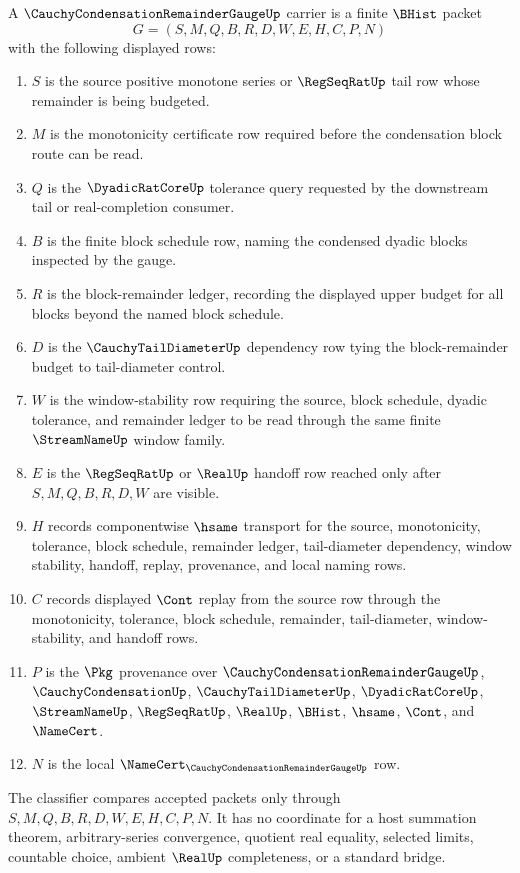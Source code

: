 \begin{definition}
\label{def:cauchy-condensation-remainder-gauge-carrier}
A $\CauchyCondensationRemainderGaugeUp$ carrier is a finite $\BHist$ packet
$$
G=(S,M,Q,B,R,D,W,E,H,C,P,N)
$$
with the following displayed rows:
\begin{enumerate}
\item $S$ is the source positive monotone series or $\RegSeqRatUp$ tail row whose remainder is being budgeted.
\item $M$ is the monotonicity certificate row required before the condensation block route can be read.
\item $Q$ is the $\DyadicRatCoreUp$ tolerance query requested by the downstream tail or real-completion consumer.
\item $B$ is the finite block schedule row, naming the condensed dyadic blocks inspected by the gauge.
\item $R$ is the block-remainder ledger, recording the displayed upper budget for all blocks beyond the named block schedule.
\item $D$ is the $\CauchyTailDiameterUp$ dependency row tying the block-remainder budget to tail-diameter control.
\item $W$ is the window-stability row requiring the source, block schedule, dyadic tolerance, and remainder ledger to be read through the same finite $\StreamNameUp$ window family.
\item $E$ is the $\RegSeqRatUp$ or $\RealUp$ handoff row reached only after $S,M,Q,B,R,D,W$ are visible.
\item $H$ records componentwise $\hsame$ transport for the source, monotonicity, tolerance, block schedule, remainder ledger, tail-diameter dependency, window stability, handoff, replay, provenance, and local naming rows.
\item $C$ records displayed $\Cont$ replay from the source row through the monotonicity, tolerance, block schedule, remainder, tail-diameter, window-stability, and handoff rows.
\item $P$ is the $\Pkg$ provenance over $\CauchyCondensationRemainderGaugeUp$, $\CauchyCondensationUp$, $\CauchyTailDiameterUp$, $\DyadicRatCoreUp$, $\StreamNameUp$, $\RegSeqRatUp$, $\RealUp$, $\BHist$, $\hsame$, $\Cont$, and $\NameCert$.
\item $N$ is the local $\NameCert_{\CauchyCondensationRemainderGaugeUp}$ row.
\end{enumerate}
The classifier compares accepted packets only through $S,M,Q,B,R,D,W,E,H,C,P,N$. It has no coordinate for a host summation theorem, arbitrary-series convergence, quotient real equality, selected limits, countable choice, ambient $\RealUp$ completeness, or a standard bridge.
\end{definition}

